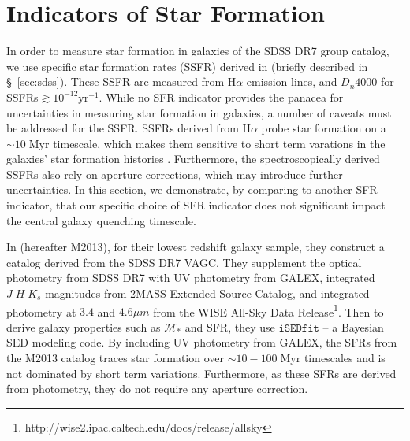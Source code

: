 \chapter{Indicators of Star Formation \label{chap:append2}}

In order to measure star formation in galaxies of the SDSS DR7 
group catalog, we use specific star formation rates (SSFR) derived
in \cite{Brinchmann:2004aa} (briefly described in \S~\ref{sec:sdss}). 
These SSFR are measured from H$\alpha$ emission lines, and 
$D_n4000$ for SSFRs$\gtrsim 10^{-12}\mathrm{yr}^{-1}$. While no 
SFR indicator provides the panacea for uncertainties in measuring
star formation in galaxies, a number of caveats must be addressed 
for the \cite{Brinchmann:2004aa} SSFR. SSFRs derived from H$\alpha$ 
probe star formation on a $\sim 10\;\mathrm{Myr}$ timescale, which 
makes them sensitive to short term varations in the galaxies' star 
formation histories \citep{Kennicutt:2012aa}. Furthermore, the 
spectroscopically derived \cite{Brinchmann:2004aa} SSFRs also 
rely on aperture corrections, which may introduce further 
uncertainties. In this section, we demonstrate, by comparing to 
another SFR indicator, that our specific choice of SFR indicator 
does not significant impact the central galaxy quenching 
timescale. 

In \cite{Moustakas:2013aa} (hereafter M2013), for their lowest redshift galaxy 
sample, they construct a catalog derived from the SDSS DR7 VAGC. 
They supplement the optical photometry from SDSS DR7 with 
UV photometry from GALEX, integrated $J\;H\;K_s$ magnitudes 
from 2MASS Extended Source Catalog, and integrated photometry 
at $3.4$ and $4.6\mu m$ from the WISE All-Sky Data Release\footnote{http://wise2.ipac.caltech.edu/docs/release/allsky}.
Then to derive galaxy properties such as $\mathcal{M}_*$ and
SFR, they use $\mathtt{iSEDfit}$ -- a Bayesian SED modeling code. 
By including UV photometry from GALEX, the SFRs from the 
M2013 catalog traces star formation over 
$\sim 10 - 100\;\mathrm{Myr}$ timescales and is not dominated
by short term variations. Furthermore, as these SFRs are 
derived from photometry, they do not require any aperture 
correction. 

